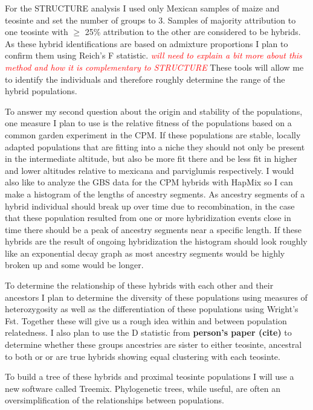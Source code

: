 \documentclass[12pt]{amsart}
\newcommand{\mbh}[1]{\textcolor{red}{ \emph{\scriptsize  #1}} }
\begin{document}
For the STRUCTURE analysis I used only Mexican samples of maize and teosinte and set the number of groups to 3.
Samples of majority attribution to one teosinte with $\geq$ 25\% attribution to the other are considered to be hybrids.
As these hybrid identifications are based on admixture proportions I plan to confirm them using Reich's F statistic. \mbh{will need to explain a bit more about this method and how it is complementary to STRUCTURE}
These tools will allow me to identify the individuals and therefore roughly determine the range of the hybrid populations.

To answer my second question about the origin and stability of the populations, one measure I plan to use is the relative fitness of the populations based on a common garden experiment in the CPM. 
If these populations are stable, locally adapted populations that are fitting into a niche they should not only be present in the intermediate altitude, but also be more fit there and be less fit in higher and lower altitudes relative to mexicana and parviglumis respectively.
I would also like to analyze the GBS data for the CPM hybrids with HapMix so I can make a histogram of the lengths of ancestry segments.
As ancestry segments of a hybrid individual should break up over time due to recombination, in the case that these population resulted from one or more hybridization events close in time there should be a peak of ancestry segments near a specific length.
If these hybrids are the result of ongoing hybridization the histogram should look roughly like an exponential decay graph as most ancestry segments would be highly broken up and some would be longer.%

To determine the relationship of these hybrids with each other and their ancestors I plan to determine the diversity of these populations using measures of heterozygosity as well as the differentiation of these populations using Wright's Fst.  
Together these will give us a rough idea within and between population relatedness.
I also plan to use the D statistic from \textbf{person's paper (cite)} to determine whether these groups ancestries are sister to either teosinte, ancestral to both or or are true hybrids showing equal clustering with each teosinte.

To build a tree of these hybrids and proximal teosinte populations I will use a new software called Treemix.
Phylogenetic trees, while useful, are often an oversimplification of the relationships between populations.%
\end{document}
